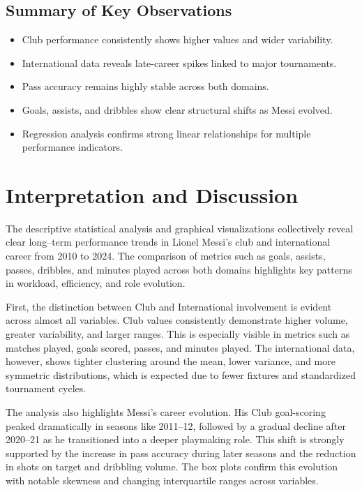 \documentclass[12pt,a4paper]{report}
\begin{document}
\section{Summary of Key Observations}

\begin{itemize}
    \item Club performance consistently shows higher values and wider variability.
    \item International data reveals late-career spikes linked to major tournaments.
    \item Pass accuracy remains highly stable across both domains.
    \item Goals, assists, and dribbles show clear structural shifts as Messi evolved.
    \item Regression analysis confirms strong linear relationships for multiple performance indicators.
\end{itemize}

\chapter{Interpretation and Discussion}

The descriptive statistical analysis and graphical visualizations collectively reveal 
clear long–term performance trends in Lionel Messi’s club and international career 
from 2010 to 2024. The comparison of metrics such as goals, assists, passes, dribbles, 
and minutes played across both domains highlights key patterns in workload, efficiency, 
and role evolution.

First, the distinction between Club and International involvement is evident across 
almost all variables. Club values consistently demonstrate higher volume, greater 
variability, and larger ranges. This is especially visible in metrics such as matches 
played, goals scored, passes, and minutes played. The international data, however, 
shows tighter clustering around the mean, lower variance, and more symmetric 
distributions, which is expected due to fewer fixtures and standardized tournament cycles.

The analysis also highlights Messi’s career evolution. His Club goal-scoring peaked 
dramatically in seasons like 2011–12, followed by a gradual decline after 2020–21 as he 
transitioned into a deeper playmaking role. This shift is strongly supported by the 
increase in pass accuracy during later seasons and the reduction in shots on target and 
dribbling volume. The box plots confirm this evolution with notable skewness and 
changing interquartile ranges across variables.
\end{document}
